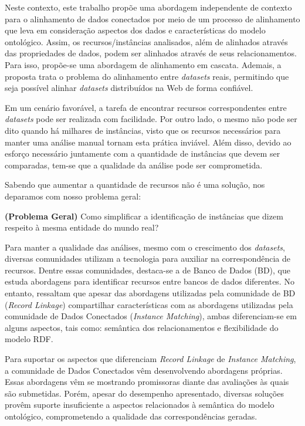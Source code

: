 Neste contexto, este trabalho propõe uma abordagem independente de contexto para o alinhamento de dados conectados por meio de um processo de alinhamento que leva em consideração aspectos dos dados e  características do modelo ontológico.
Assim, os recursos/instâncias analisados, além de alinhados através das propriedades de dados, podem ser alinhados através de seus relacionamentos. Para isso, propõe-se uma abordagem de alinhamento em cascata. Ademais, a proposta trata o problema do alinhamento entre \textit{datasets} reais, permitindo que seja possível alinhar \textit{datasets} distribuídos na Web de forma confiável.


Em um cenário favorável, a tarefa de encontrar recursos correspondentes entre \textit{datasets} pode ser realizada com facilidade. Por outro lado, o mesmo não pode ser dito quando há milhares de instâncias, visto que os recursos necessários para manter uma análise manual tornam esta prática inviável. Além disso, devido ao esforço necessário juntamente com a quantidade de instâncias que devem ser comparadas, tem-se que a qualidade da análise pode ser comprometida.

Sabendo que aumentar a quantidade de recursos não é uma solução, nos deparamos com nosso problema geral:

\textbf{(Problema Geral)} Como simplificar a identificação de instâncias que dizem respeito à mesma entidade do mundo real?

Para manter a qualidade das análises, mesmo com o crescimento dos \textit{datasets}, diversas comunidades utilizam a tecnologia para auxiliar na correspondência de recursos. Dentre essas comunidades, destaca-se a de Banco de Dados (BD), que estuda abordagens para identificar recursos entre bancos de dados diferentes. No entanto,  ressaltam que apesar das abordagens utilizadas pela comunidade de BD (\textit{Record Linkage}) compartilhar características com as abordagens utilizadas pela comunidade de Dados Conectados (\textit{Instance Matching}), ambas diferenciam-se em alguns aspectos, tais como: semântica dos relacionamentos e flexibilidade do modelo RDF.

Para suportar os aspectos que diferenciam \textit{Record Linkage} de \textit{Instance Matching}, a comunidade de Dados Conectados vêm desenvolvendo abordagens próprias. Essas abordagens vêm se mostrando promissoras diante das avaliações às quais são submetidas. Porém, apesar do desempenho apresentado, diversas soluções provêm suporte insuficiente a aspectos relacionados à semântica do modelo ontológico, comprometendo a qualidade das correspondências geradas.

